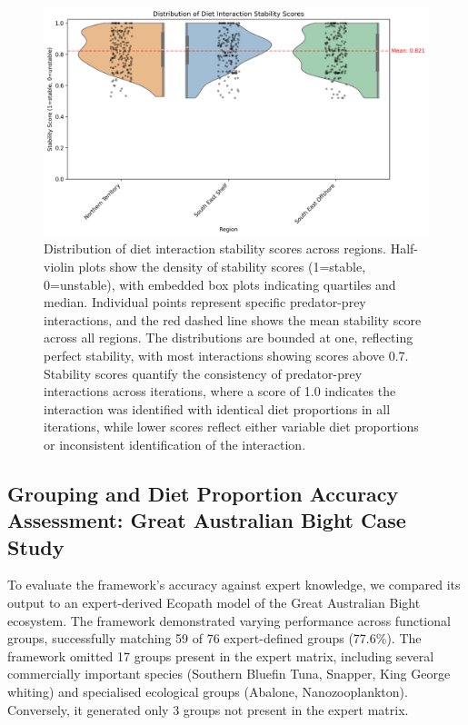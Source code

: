 \begin{figure}[htbp]
    \centering
    \includegraphics[width=\textwidth]{figures/stability_score_distribution.png}
    \caption{Distribution of diet interaction stability scores across regions. Half-violin plots show the density of stability scores (1=stable, 0=unstable), with embedded box plots indicating quartiles and median. Individual points represent specific predator-prey interactions, and the red dashed line shows the mean stability score across all regions. The distributions are bounded at one, reflecting perfect stability, with most interactions showing scores above 0.7. Stability scores quantify the consistency of predator-prey interactions across iterations, where a score of 1.0 indicates the interaction was identified with identical diet proportions in all iterations, while lower scores reflect either variable diet proportions or inconsistent identification of the interaction. }
    \label{fig:stability_distribution}
\end{figure}

\subsection{Grouping and Diet Proportion Accuracy Assessment: Great Australian Bight Case Study}

To evaluate the framework's accuracy against expert knowledge, we compared its output to an expert-derived Ecopath model of the Great Australian Bight ecosystem. The framework demonstrated varying performance across functional groups, successfully matching 59 of 76 expert-defined groups (77.6\%). The framework omitted 17 groups present in the expert matrix, including several commercially important species (Southern Bluefin Tuna, Snapper, King George whiting) and specialised ecological groups (Abalone, Nanozooplankton). Conversely, it generated only 3 groups not present in the expert matrix.

